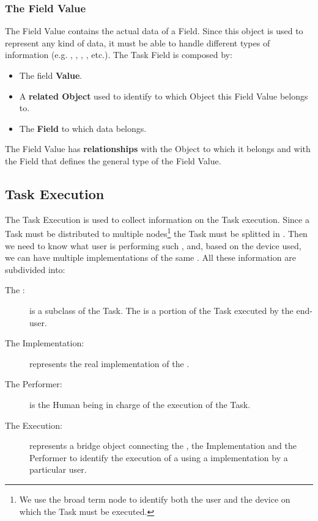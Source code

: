 \subsubsection{The Field Value}
The Field Value contains the actual data of a Field. Since this object is used
to represent any kind of data, it must be able to handle different types of
information (e.g. , , , , etc.).
The Task Field is composed by:
\begin{itemize}
    \item The field \textbf{Value}.
    \item A \textbf{related Object} used to identify to which Object this Field
    Value belongs to.
    \item The \textbf{Field} to which data belongs.
\end{itemize}

The Field Value has \textbf{relationships} with the Object to which it belongs
and with the Field that defines the general type of the Field Value.








\subsection{Task Execution}
The Task Execution is used to collect information on the Task execution. Since
a Task must be distributed to multiple nodes\footnote{We use the broad term node
to identify both the user and the device on which the Task must be executed.} the
Task must be splitted in \utask{}. Then we need to know what user is performing
such \utask{}, and, based on the device used, we can have multiple implementations
of the same \utask{}. All these information are subdivided into:
\begin{description}
    \item[The \utask{}:] is a subclass of the Task. The \utask{} is a portion
    of the Task executed by the end-user.
    \item[The \utask{} Implementation:] represents the real implementation
    of the \utask{}.
    \item[The Performer:] is the Human being in charge of the execution of the
    Task.
    \item[The Execution:] represents a bridge object connecting the \utask{},
    the \utask{} Implementation and the Performer to identify the execution of a
    \utask{} using a \utask{} implementation by a particular user.
\end{description}


